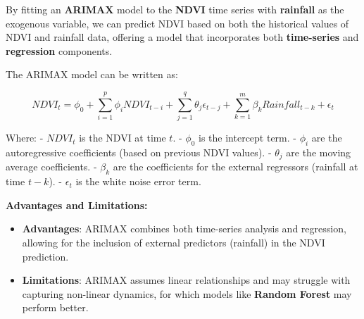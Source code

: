 \documentclass[
]{article}
\newenvironment{Shaded}{}{}
\newcommand{\AttributeTok}[1]{\textcolor[rgb]{0.49,0.56,0.16}{#1}}
\newcommand{\CommentTok}[1]{\textcolor[rgb]{0.38,0.63,0.69}{\textit{#1}}}
\newcommand{\DecValTok}[1]{\textcolor[rgb]{0.25,0.63,0.44}{#1}}
\newcommand{\FunctionTok}[1]{\textcolor[rgb]{0.02,0.16,0.49}{#1}}
\newcommand{\NormalTok}[1]{#1}
\newcommand{\OtherTok}[1]{\textcolor[rgb]{0.00,0.44,0.13}{#1}}
\newcommand{\SpecialCharTok}[1]{\textcolor[rgb]{0.25,0.44,0.63}{#1}}
\providecommand{\tightlist}{%
  \setlength{\itemsep}{0pt}\setlength{\parskip}{0pt}}
\begin{document}
By fitting an \textbf{ARIMAX} model to the \textbf{NDVI} time series
with \textbf{rainfall} as the exogenous variable, we can predict NDVI
based on both the historical values of NDVI and rainfall data, offering
a model that incorporates both \textbf{time-series} and
\textbf{regression} components.

The ARIMAX model can be written as:

\[
NDVI_t = \phi_0 + \sum_{i=1}^{p} \phi_i NDVI_{t-i} + \sum_{j=1}^{q} \theta_j \epsilon_{t-j} + \sum_{k=1}^{m} \beta_k Rainfall_{t-k} + \epsilon_t
\]

Where: - \(NDVI_t\) is the NDVI at time \(t\). - \(\phi_0\) is the
intercept term. - \(\phi_i\) are the autoregressive coefficients (based
on previous NDVI values). - \(\theta_j\) are the moving average
coefficients. - \(\beta_k\) are the coefficients for the external
regressors (rainfall at time \(t-k\)). - \(\epsilon_t\) is the white
noise error term.

\textbf{Advantages and Limitations:}

\begin{itemize}
\tightlist
\item
  \textbf{Advantages}: ARIMAX combines both time-series analysis and
  regression, allowing for the inclusion of external predictors
  (rainfall) in the NDVI prediction.
\item
  \textbf{Limitations}: ARIMAX assumes linear relationships and may
  struggle with capturing non-linear dynamics, for which models like
  \textbf{Random Forest} may perform better.
\end{itemize}

\begin{Shaded}
\end{Shaded}
\end{document}
